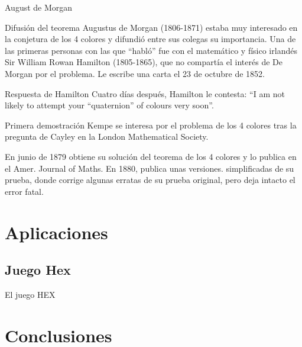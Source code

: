 \documentclass[spanish,utf8]{beamer}
\theoremstyle{definition}
\begin{document}
\begin{frame}{\insertsection}\transblindsvertical
August de Morgan
\begin{block}{Difusión del teorema}
Augustus de Morgan (1806-1871) estaba muy interesado en la conjetura de los 4 colores y difundió entre sus colegas su importancia. Una de las primeras personas con las que ``habló'' fue con el matemático y físico irlandés Sir William Rowan Hamilton (1805-1865), que no compartía el interés de De Morgan por el problema. Le escribe una carta el 23 de octubre de 1852.
\end{block}

\begin{block}{Respuesta de Hamilton}
Cuatro días después, Hamilton le contesta: ``I am not likely to attempt your “quaternion” of colours very soon''.
\end{block}    
\end{frame}

\begin{frame}{\insertsection}\transblindsvertical
\begin{block}{Primera demostración}
Kempe se interesa por el problema de los 4 colores tras la pregunta de Cayley en la London Mathematical Society.
\end{block}

\begin{block}{}
En junio de 1879 obtiene su solución del teorema de los 4 colores y lo publica en el Amer. Journal of Maths. En 1880, publica unas versiones. simplificadas de su prueba, donde corrige algunas erratas de su prueba original, pero deja intacto el error fatal.
\end{block}
\end{frame}

\section{Aplicaciones}

\subsection{Juego Hex}

\begin{frame}[c]{\insertsection}\transblindsvertical
\centering\LARGE
\color{red}El juego HEX
\end{frame}

\section{Conclusiones}
\end{document}

